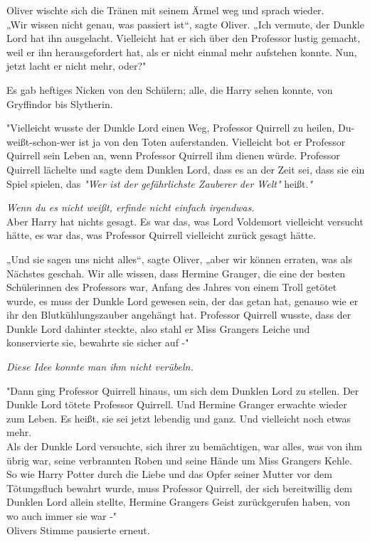 {Oliver wischte sich die Tränen mit seinem Ärmel weg und sprach wieder.\\ „Wir wissen nicht genau, was passiert ist“, sagte Oliver. „Ich vermute, der Dunkle Lord hat ihn ausgelacht. Vielleicht hat er sich über den Professor lustig gemacht, weil er ihn herausgefordert hat, als er nicht einmal mehr aufstehen konnte. Nun, jetzt lacht er nicht mehr, oder?"

Es gab heftiges Nicken von den Schülern; alle, die Harry sehen konnte, von Gryffindor bis Slytherin.

"Vielleicht wusste der Dunkle Lord einen Weg, Professor Quirrell zu heilen, Du-weißt-schon-wer ist ja von den Toten auferstanden. Vielleicht bot er Professor Quirrell sein Leben an, wenn Professor Quirrell ihm dienen würde. Professor Quirrell lächelte und sagte dem Dunklen Lord, dass es an der Zeit sei, dass sie ein Spiel spielen, das \emph{"Wer ist der gefährlichste Zauberer der Welt"} heißt.\emph{"}

\emph{Wenn du es nicht weißt, erfinde nicht einfach irgendwas.}\\ Aber Harry hat nichts gesagt. Es war das, was Lord Voldemort vielleicht versucht hätte, es war das, was Professor Quirrell vielleicht zurück gesagt hätte.

„Und sie sagen uns nicht alles“, sagte Oliver, „aber wir können erraten, was als Nächstes geschah. Wir alle wissen, dass Hermine Granger, die eine der besten Schülerinnen des Professors war, Anfang des Jahres von einem Troll getötet wurde, es muss der Dunkle Lord gewesen sein, der das getan hat, genauso wie er ihr den Blutkühlungszauber angehängt hat. Professor Quirrell wusste, dass der Dunkle Lord dahinter steckte, also stahl er Miss Grangers Leiche und konservierte sie, bewahrte sie sicher auf -"

\emph{Diese Idee konnte man ihm nicht verübeln.}

"Dann ging Professor Quirrell hinaus, um sich dem Dunklen Lord zu stellen. Der Dunkle Lord tötete Professor Quirrell. Und Hermine Granger erwachte wieder zum Leben. Es heißt, sie sei jetzt lebendig und ganz. Und vielleicht noch etwas mehr.\\ Als der Dunkle Lord versuchte, sich ihrer zu bemächtigen, war alles, was von ihm übrig war, seine verbrannten Roben und seine Hände um Miss Grangers Kehle.\\ So wie Harry Potter durch die Liebe und das Opfer seiner Mutter vor dem Tötungsfluch bewahrt wurde, muss Professor Quirrell, der sich bereitwillig dem Dunklen Lord allein stellte, Hermine Grangers Geist zurückgerufen haben, von wo auch immer sie war -"\\ Olivers Stimme pausierte erneut.

}
